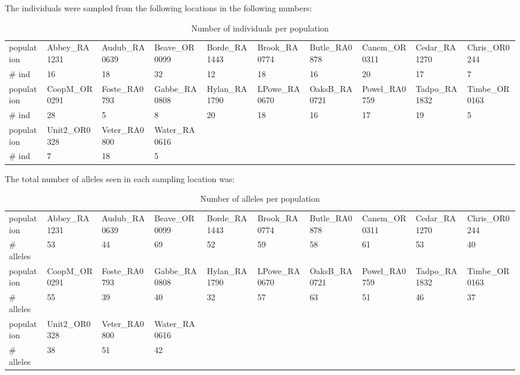 \documentclass[a4paper]{scrartcl}\usepackage[]{graphicx}\usepackage[]{color}
\begin{document}
\noindent 
\newline The individuals were sampled from the following locations in the following numbers: 


\begin{table}[ht]
\centering
\begin{tabular}{llllllllll}
   \hline
population & Abbey\_RA1231 & Audub\_RA0639 & Beave\_OR0099 & Borde\_RA1443 & Brook\_RA0774 & Butle\_RA0878 & Canem\_OR0311 & Cedar\_RA1270 & Chris\_OR0244 \\ 
   \rowcolor[gray]{0.9} \# ind & 16 & 18 & 32 & 12 & 18 & 16 & 20 & 17 & 7 \\ 
  population & CoopM\_OR0291 & Foste\_RA0793 & Gabbe\_RA0808 & Hylan\_RA1790 & LPowe\_RA0670 & OaksB\_RA0721 & Powel\_RA0759 & Tadpo\_RA1832 & Timbe\_OR0163 \\ 
   \rowcolor[gray]{0.9} \# ind & 28 & 5 & 8 & 20 & 18 & 16 & 17 & 19 & 5 \\ 
  population & Unit2\_OR0328 & Veter\_RA0800 & Water\_RA0616 &  &  &  &  &  &  \\ 
   \rowcolor[gray]{0.9} \# ind & 7 & 18 & 5 &  &  &  &  &  &  \\ 
   \hline
\end{tabular}
\caption{Number of individuals per population} 
\end{table}


\noindent
{} 
\newline The total number of alleles seen in each sampling location was:



\begin{table}[ht]
\centering
\begin{tabular}{llllllllll}
   \hline
population & Abbey\_RA1231 & Audub\_RA0639 & Beave\_OR0099 & Borde\_RA1443 & Brook\_RA0774 & Butle\_RA0878 & Canem\_OR0311 & Cedar\_RA1270 & Chris\_OR0244 \\ 
   \rowcolor[gray]{0.9} \# alleles & 53 & 44 & 69 & 52 & 59 & 58 & 61 & 53 & 40 \\ 
  population & CoopM\_OR0291 & Foste\_RA0793 & Gabbe\_RA0808 & Hylan\_RA1790 & LPowe\_RA0670 & OaksB\_RA0721 & Powel\_RA0759 & Tadpo\_RA1832 & Timbe\_OR0163 \\ 
   \rowcolor[gray]{0.9} \# alleles & 55 & 39 & 40 & 32 & 57 & 63 & 51 & 46 & 37 \\ 
  population & Unit2\_OR0328 & Veter\_RA0800 & Water\_RA0616 &  &  &  &  &  &  \\ 
   \rowcolor[gray]{0.9} \# alleles & 38 & 51 & 42 &  &  &  &  &  &  \\ 
   \hline
\end{tabular}
\caption{Number of alleles per population} 
\end{table}
\end{document}
